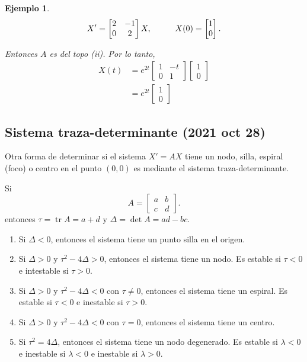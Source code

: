 \documentclass[11pt,letterpaper,draft]{report}
\newtheorem{exa}{Ejemplo}
\newcommand\<{\langle}
\renewcommand\>{\rangle}
\DeclareMathOperator{\tr}{tr}
\begin{document}
\begin{exa}
  \[
    X'=
    \begin{bmatrix}
      2 & -1 \\ 0 & 2
    \end{bmatrix}
    X,
    \hspace{10mm}
    X(0)=
    \begin{bmatrix}
      1 \\ 0
    \end{bmatrix}
  .\]

  Entonces $A$ es del topo (ii). Por lo tanto,
  \begin{align*}
    X(t)
    &= e^{2t}
    \begin{bmatrix}
      1 & -t \\ 0 & 1
    \end{bmatrix}
    \begin{bmatrix}
      1 \\ 0
    \end{bmatrix} \\
    &= e^{2t}
    \begin{bmatrix}
      1 \\ 0
    \end{bmatrix}
  \end{align*}
  
\end{exa}


\subsection{Sistema traza-determinante (2021 oct 28)}

Otra forma de determinar si el sistema $X'=AX$ tiene un nodo,
silla, espiral (foco) o centro en el punto $(0,0)$ es mediante el
sistema traza-determinante.

Si
\[
  A=
  \begin{bmatrix}
    a & b \\ c & d
  \end{bmatrix}
.\]
entonces $\tau=\tr A=a+d$ y $\Delta=\det A=ad-bc$.

\begin{enumerate}
  \item
  Si $\Delta<0$, entonces el sistema tiene un punto silla en el
  origen.
  
  \item
  Si $\Delta>0$ y $\tau^2-4\Delta>0$, entonces el sistema tiene
  un nodo. Es estable si $\tau<0$ e intestable si $\tau>0$.

  \item
  Si $\Delta>0$ y $\tau^2-4\Delta<0$ con $\tau\neq 0$, entonces
  el sistema tiene un espiral. Es estable si $\tau<0$ e inestable
  si $\tau>0$.

  \item
  Si $\Delta>0$ y $\tau^2-4\Delta<0$ con $\tau=0$, entonces el
  sistema tiene un centro.

  \item
  Si $\tau^2=4\Delta$, entonces el sistema tiene un nodo
  degenerado. Es estable si $\lambda<0$ e inestable si
  $\lambda<0$ e inestable si $\lambda>0$.
\end{enumerate}
\end{document}
